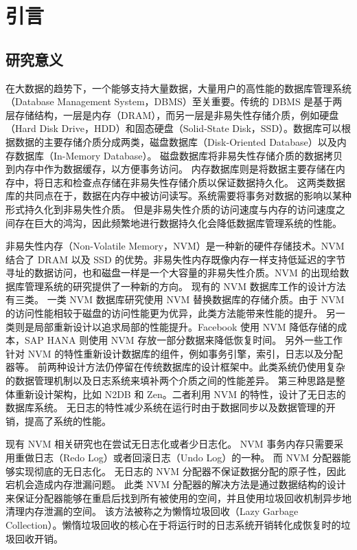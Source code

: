 
\chapter{引言}

\section{研究意义}

在大数据的趋势下，一个能够支持大量数据，大量用户的高性能的数据库管理系统（Database Management System，DBMS）至关重要。传统的 DBMS 是基于两层存储结构，一层是内存（DRAM），而另一层是非易失性存储介质，例如硬盘（Hard Disk Drive，HDD）和固态硬盘（Solid-State Disk，SSD）。数据库可以根据数据的主要存储介质分成两类，磁盘数据库（Disk-Oriented Database）以及内存数据库（In-Memory Database）。
磁盘数据库将非易失性存储介质的数据拷贝到内存中作为数据缓存，以方便事务访问。
内存数据库则是将数据主要存储在内存中，将日志和检查点存储在非易失性存储介质以保证数据持久化。
这两类数据库的共同点在于，数据在内存中被访问读写。系统需要将事务对数据的影响以某种形式持久化到非易失性介质。
但是非易失性介质的访问速度与内存的访问速度之间存在巨大的鸿沟，因此频繁地进行数据持久化会降低数据库管理系统的性能。

非易失性内存（Non-Volatile Memory，NVM）是一种新的硬件存储技术。NVM 结合了 DRAM 以及 SSD 的优势。非易失性内存既像内存一样支持低延迟的字节寻址的数据访问，也和磁盘一样是一个大容量的非易失性介质。NVM 的出现给数据库管理系统的研究提供了一种新的方向。
现有的 NVM 数据库工作的设计方法有三类。
一类 NVM 数据库研究使用 NVM 替换数据库的存储介质\cite{arulraj_lets_2015, van_renen_managing_2018,mariaDB}。由于 NVM 的访问性能相较于磁盘的访问性能更为优异，此类方法能带来性能的提升。
另一类则是局部重新设计以追求局部的性能提升。Facebook 使用 NVM 降低存储的成本\cite{facebook}，SAP HANA 则使用 NVM 存放一部分数据来降低恢复时间\cite{andrei_sap_2017}。
另外一些工作针对 NVM 的特性重新设计数据库的组件，例如事务引擎\cite{liu2018dudetx}，索引\cite{nv-tree,chen_persistent_2015,ma_roart_2021,arulraj2018bztree}，日志\cite{wbl}以及分配器\cite{pmdk,bhandari_makalu_2016}等。
前两种设计方法仍停留在传统数据库的设计框架中。此类系统仍使用复杂的数据管理机制以及日志系统来填补两个介质之间的性能差异。
第三种思路是整体重新设计架构，比如 N2DB\cite{liu_graduate_chinese} 和 Zen\cite{liu_zen_2021}。二者利用 NVM 的特性，设计了无日志的数据库系统。
无日志的特性减少系统在运行时由于数据同步以及数据管理的开销，提高了系统的性能。

现有 NVM 相关研究也在尝试无日志化或者少日志化。
NVM 事务内存只需要采用重做日志（Redo Log）或者回滚日志（Undo Log）的一种\cite{coburn_nv-heaps_2011, kolli_high-performance_2016,volos_mnemosyne_2011, giles_softwrap_2015, giles2017continuous}。
而 NVM 分配器能够实现彻底的无日志化\cite{bhandari_makalu_2016,cai_understanding_2020}。
无日志的 NVM 分配器不保证数据分配的原子性，因此宕机会造成内存泄漏问题。
此类 NVM 分配器的解决方法是通过数据结构的设计来保证分配器能够在重启后找到所有被使用的空间，并且使用垃圾回收机制异步地清理内存泄漏的空间。
该方法被称之为懒惰垃圾回收（Lazy Garbage Collection）。懒惰垃圾回收的核心在于将运行时的日志系统开销转化成恢复时的垃圾回收开销。

